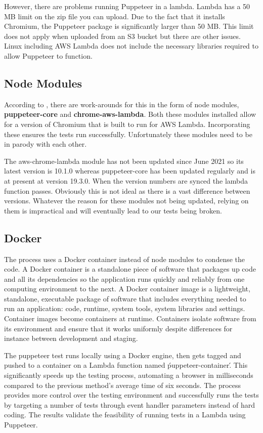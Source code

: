 \documentclass[12pt,a4paper,titlepage]{report}
\begin{document}
However, there are problems running Puppeteer in a lambda. Lambda has a 50 MB limit on the zip file you can upload. 
Due to the fact that it installs Chromium, the Puppeteer package is significantly larger than 50 {MB}. This 
limit does not apply when uploaded from an S3 bucket but there are other issues. 
Linux including AWS Lambda does not include the necessary libraries required to allow Puppeteer to function.

\subsection{Node Modules}

According to \autocite{Hansen}, there are work-arounds for this in the form of node modules, \textbf{puppeteer-core} and \textbf{chrome-aws-lambda}.
Both these modules installed allow for a version of Chromium that is built to run for AWS Lambda. Incorporating
these ensures the tests run successfully. Unfortunately these modules need to be in parody with each other.

The aws-chrome-lambda module has not been updated since June 2021 so its latest version is 10.1.0 whereas
puppeteer-core has been updated regularly and is at present at version 19.3.0. When the version numbers are
synced the lambda function passes. Obviously this is not ideal as there is a vast difference between versions.
Whatever the reason for these modules not being updated, relying on them is impractical and will eventually lead to our tests being broken.

\subsection{Docker}
 
The process uses a Docker container instead of node modules to condense the code. A Docker
container is a standalone piece of software that packages up code and all its dependencies so the application runs quickly and reliably from one computing environment to the next.
A Docker container image is a lightweight, standalone, executable package of software that includes everything needed to run an application: code, runtime, system tools, system libraries and settings.
Container images become containers at runtime. Containers isolate software from its environment and ensure that it works uniformly despite differences for instance between development and staging.

The puppeteer test runs locally using a Docker engine, then gets tagged and pushed to a container on a Lambda function named \'puppeteer-container\'.
This significantly speeds up the testing process, automating a browser in milliseconds compared to the previous method's average time of six seconds.
The process provides more control over the testing environment and successfully runs the tests by targeting a number of tests through event handler parameters instead of hard coding.
The results validate the feasibility of running tests in a Lambda using Puppeteer.
\end{document}
